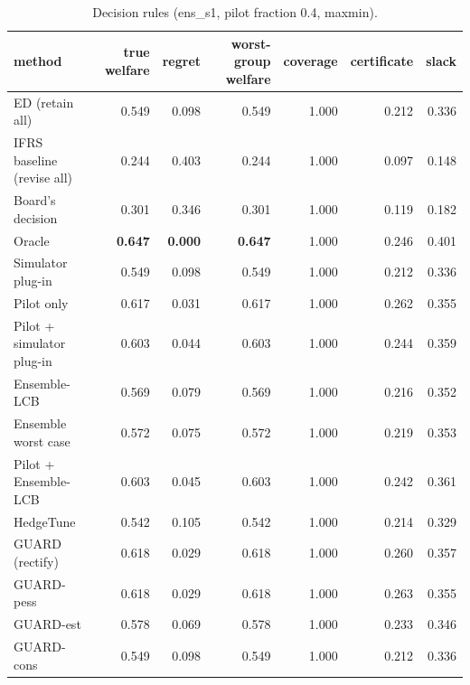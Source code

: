 \begin{table}[t]
\centering
\small
\begin{tabular}{lrrrrrr}
\toprule
method & true welfare & regret & worst-group welfare & coverage & certificate & slack \\
\midrule
ED (retain all) & 0.549 & 0.098 & 0.549 & 1.000 & 0.212 & 0.336 \\
IFRS baseline (revise all) & 0.244 & 0.403 & 0.244 & 1.000 & 0.097 & 0.148 \\
Board's decision & 0.301 & 0.346 & 0.301 & 1.000 & 0.119 & 0.182 \\
Oracle & \textbf{0.647} & \textbf{0.000} & \textbf{0.647} & 1.000 & 0.246 & 0.401 \\
Simulator plug-in & 0.549 & 0.098 & 0.549 & 1.000 & 0.212 & 0.336 \\
Pilot only & 0.617 & 0.031 & 0.617 & 1.000 & 0.262 & 0.355 \\
Pilot + simulator plug-in & 0.603 & 0.044 & 0.603 & 1.000 & 0.244 & 0.359 \\
Ensemble-LCB & 0.569 & 0.079 & 0.569 & 1.000 & 0.216 & 0.352 \\
Ensemble worst case & 0.572 & 0.075 & 0.572 & 1.000 & 0.219 & 0.353 \\
Pilot + Ensemble-LCB & 0.603 & 0.045 & 0.603 & 1.000 & 0.242 & 0.361 \\
HedgeTune & 0.542 & 0.105 & 0.542 & 1.000 & 0.214 & 0.329 \\
GUARD (rectify) & 0.618 & 0.029 & 0.618 & 1.000 & 0.260 & 0.357 \\
GUARD-pess & 0.618 & 0.029 & 0.618 & 1.000 & 0.263 & 0.355 \\
GUARD-est & 0.578 & 0.069 & 0.578 & 1.000 & 0.233 & 0.346 \\
GUARD-cons & 0.549 & 0.098 & 0.549 & 1.000 & 0.212 & 0.336 \\
\bottomrule
\end{tabular}
\caption{Decision rules (ens\_s1, pilot fraction 0.4, maxmin).}
\label{tab:methods-maxmin}
\end{table}
